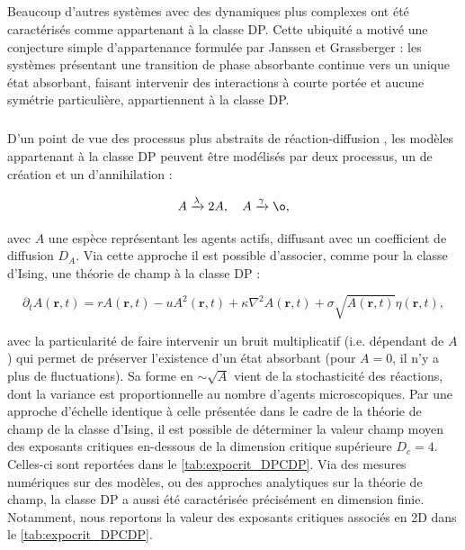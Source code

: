 \subparagraph{}Beaucoup d'autres systèmes avec des dynamiques plus complexes ont été caractérisés comme appartenant à la classe DP. Cette ubiquité a motivé une conjecture simple d'appartenance formulée par Janssen et Grassberger \cite{janssen_nonequilibrium_1981, grassberger_phase_1982} : les systèmes présentant une transition de phase absorbante continue vers un unique état absorbant, faisant intervenir des interactions à courte portée et aucune symétrie particulière, appartiennent à la classe DP.

\subparagraph{}D'un point de vue des processus plus abstraits de réaction-diffusion \cite{tauber_applications_2005}, les modèles appartenant à la classe DP peuvent être modélisés par deux processus, un de création et un d’annihilation :

\begin{equation}
A \xrightarrow[]{\lambda} 2A, \quad A \xrightarrow[]{\gamma} \o,
\label{eq:ReacDiffDP}
\end{equation}

\noindent avec $A$ une espèce représentant les agents actifs, diffusant avec un coefficient de diffusion $D_A$. Via cette approche il est possible d'associer, comme pour la classe d'Ising, une théorie de champ à la classe DP :

\begin{equation}
	\partial_t A(\mathbf{r}, t) = rA(\mathbf{r}, t) - uA^2(\mathbf{r}, t) + \kappa\nabla^2 A (\mathbf{r}, t) + \sigma \sqrt{A(\mathbf{r}, t)} \eta(\mathbf{r}, t),
	\label{eq:eqDP}
\end{equation}

\noindent avec la particularité de faire intervenir un bruit multiplicatif (i.e. dépendant de $A$) qui permet de préserver l'existence d'un état absorbant (pour $A=0$, il n'y a plus de fluctuations). Sa forme en $\sim \sqrt{A}$ vient de la stochasticité des réactions, dont la variance est proportionnelle au nombre d'agents microscopiques.  Par une approche d'échelle identique à celle présentée dans le cadre de la théorie de champ de la classe d'Ising, il est possible de déterminer la valeur champ moyen des exposants critiques en-dessous de la dimension critique supérieure $D_c = 4$. Celles-ci sont reportées dans le \autoref{tab:expocrit_DPCDP}. Via des mesures numériques sur des modèles, ou des approches analytiques sur la théorie de champ, la classe DP a aussi été caractérisée précisément en dimension finie. Notamment, nous reportons la valeur des exposants critiques associés en 2D dans le \autoref{tab:expocrit_DPCDP}.

